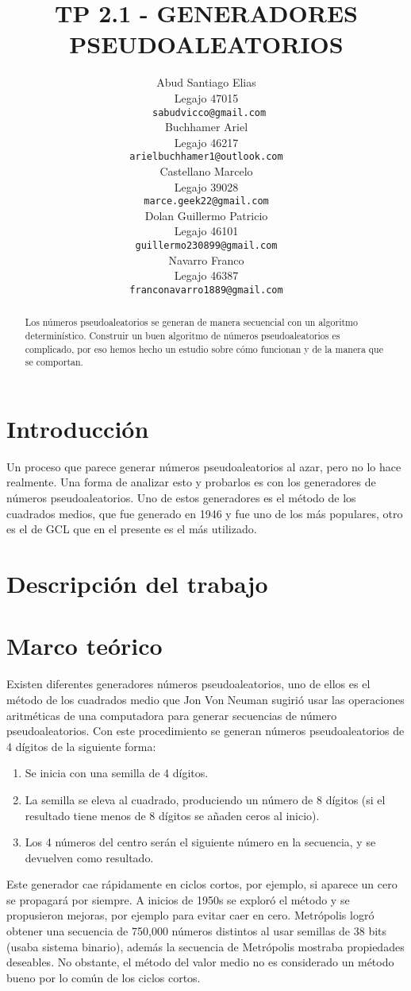\documentclass{article}
\title{TP 2.1 - GENERADORES PSEUDOALEATORIOS}
\author{
    Abud Santiago Elias \\
    Legajo 47015 \\
    \texttt{ sabudvicco@gmail.com} \\
    \And
    Buchhamer Ariel \\
    Legajo 46217\\
    \texttt{arielbuchhamer1@outlook.com} \\
    \And
    Castellano Marcelo \\
    Legajo 39028 \\
    \texttt{marce.geek22@gmail.com} \\
    \And
    Dolan Guillermo Patricio \\
    Legajo 46101\\
    \texttt{guillermo230899@gmail.com} \\
    \And
    Navarro Franco \\
    Legajo 46387 \\
    \texttt{franconavarro1889@gmail.com} \\
}
\begin{document}
\maketitle
\begin{abstract}
Los números pseudoaleatorios se generan de manera secuencial con un algoritmo determinístico. Construir un buen algoritmo de números pseudoaleatorios es complicado, por eso hemos hecho un estudio sobre cómo funcionan y de la manera que se comportan.
\end{abstract}




\section{Introducción}
Un proceso que parece generar números pseudoaleatorios al azar, pero no lo hace realmente. Una forma de analizar esto y probarlos es con los generadores de números pseudoaleatorios. Uno de estos generadores es el método de los cuadrados medios, que fue generado en 1946 y fue uno de los más populares, otro es el de GCL que en el presente es el más utilizado.



\section{Descripción del trabajo}



\section{Marco teórico}
Existen diferentes generadores números pseudoaleatorios, uno de ellos es el método de los cuadrados medio que Jon Von Neuman sugirió usar las operaciones aritméticas de una computadora para generar secuencias de número pseudoaleatorios. Con este procedimiento se generan números pseudoaleatorios de 4 dígitos de la siguiente forma:
\begin{enumerate}
    \item Se inicia con una semilla de 4 dígitos.
    \item La semilla se eleva al cuadrado, produciendo un número de 8 dígitos (si el resultado tiene menos de 8 dígitos se añaden ceros al inicio). 
    \item Los 4 números del centro serán el siguiente número en la secuencia, y se devuelven como resultado. 
\end{enumerate}
Este generador cae rápidamente en ciclos cortos, por ejemplo, si aparece un cero se propagará por siempre.
A inicios de 1950s se exploró el método y se propusieron mejoras, por ejemplo para evitar caer en cero. Metrópolis logró obtener una secuencia de 750,000 números distintos al usar semillas de 38 bits (usaba sistema binario), además la secuencia de Metrópolis mostraba propiedades deseables. No obstante, el método del valor medio no es considerado un método bueno por lo común de los ciclos cortos.
\end{document}
